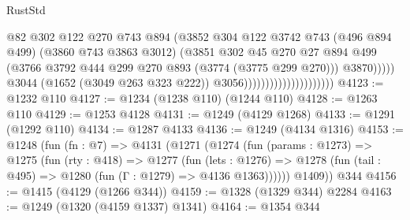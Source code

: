 \begin{lexlean}{RustStd}
\begin{coremodule}
{\begin{coremodule}
{{{{{{{{{{{                                                    @82
                                                    @302
                                                    @122
                                                    @270
                                                    @743
                                                    @894
                                                    (@3852
                                                      @304
                                                      @122
                                                      @3742
                                                      @743
                                                      (@496 @894 @499)
                                                      (@3860 @743 @3863 @3012)
                                                      (@3851
                                                        @302
                                                        @45
                                                        @270
                                                        @27
                                                        @894
                                                        @499
                                                        (@3766
                                                          @3792
                                                          @444
                                                          @299
                                                          @270
                                                          @893
                                                          (@3774 (@3775 @299 @270)))
                                                        @3870)))))
                                              @3044
                                              (@1652 (@3049 @263 @323 @222))
                                              @3056)))))))))))))))))))))
@4123 := @1232 @110
@4127 := @1234 (@1238 @110) (@1244 @110)
@4128 := @1263 @110
@4129 := @1253 @4128
@4131 := @1249 (@4129 @1268)
@4133 := @1291 (@1292 @110)
@4134 := @1287 @4133
@4136 := @1249 (@4134 @1316)
@4153 := @1248
    (fun (fn : @7) =>
    @4131
      (@1271
        (@1274
          (fun (params : @1273) =>
          @1275
            (fun (rty : @418) =>
            @1277
              (fun (lets : @1276) =>
              @1278 (fun (tail : @495) => @1280 (fun (Γ : @1279) => @4136 @1363))))))
        @1409))
    @344
@4156 := @1415 (@4129 (@1266 @344))
@4159 := @1328 (@1329 @344) @2284
@4163 := @1249 (@1320 (@4159 @1337) @1341)
@4164 := @1354 @344
}}}}}}}}}}}
\end{coremodule}}
\end{coremodule}
\end{lexlean}
